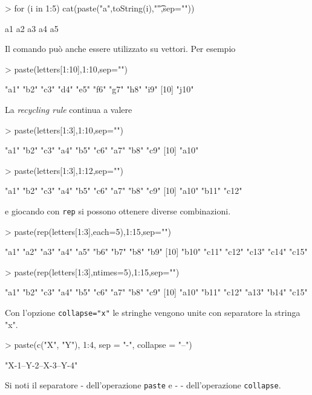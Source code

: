 \documentclass[onecolumn,11pt]{book}
\begin{document}
\begin{Schunk}
\begin{Sinput}
> for (i in 1:5) cat(paste("a",toString(i),"\t",sep=""))
\end{Sinput}
\begin{Soutput}
a1	a2	a3	a4	a5	
\end{Soutput}
\end{Schunk}
Il comando pu\`o anche essere utilizzato su vettori. 
Per esempio
\begin{Schunk}
\begin{Sinput}
> paste(letters[1:10],1:10,sep="")
\end{Sinput}
\begin{Soutput}
 [1] "a1"  "b2"  "c3"  "d4"  "e5"  "f6"  "g7"  "h8"  "i9" 
[10] "j10"
\end{Soutput}
\end{Schunk}
La \textit{recycling rule} continua a valere

\begin{Schunk}
\begin{Sinput}
> paste(letters[1:3],1:10,sep="")
\end{Sinput}
\begin{Soutput}
 [1] "a1"  "b2"  "c3"  "a4"  "b5"  "c6"  "a7"  "b8"  "c9" 
[10] "a10"
\end{Soutput}
\begin{Sinput}
> paste(letters[1:3],1:12,sep="")
\end{Sinput}
\begin{Soutput}
 [1] "a1"  "b2"  "c3"  "a4"  "b5"  "c6"  "a7"  "b8"  "c9" 
[10] "a10" "b11" "c12"
\end{Soutput}
\end{Schunk}
e giocando con \texttt{rep} si possono ottenere diverse combinazioni.
\begin{Schunk}
\begin{Sinput}
> paste(rep(letters[1:3],each=5),1:15,sep="")
\end{Sinput}
\begin{Soutput}
 [1] "a1"  "a2"  "a3"  "a4"  "a5"  "b6"  "b7"  "b8"  "b9" 
[10] "b10" "c11" "c12" "c13" "c14" "c15"
\end{Soutput}
\begin{Sinput}
> paste(rep(letters[1:3],ntimes=5),1:15,sep="") 
\end{Sinput}
\begin{Soutput}
 [1] "a1"  "b2"  "c3"  "a4"  "b5"  "c6"  "a7"  "b8"  "c9" 
[10] "a10" "b11" "c12" "a13" "b14" "c15"
\end{Soutput}
\end{Schunk}
Con l'opzione \texttt{collapse="x"} le stringhe vengono unite con separatore la stringa "x".
\begin{Schunk}
\begin{Sinput}
> paste(c("X", "Y"), 1:4, sep = "-", collapse = "--")
\end{Sinput}
\begin{Soutput}
[1] "X-1--Y-2--X-3--Y-4"
\end{Soutput}
\end{Schunk}
Si noti il separatore - dell'operazione \texttt{paste} e  - - dell'operazione \texttt{collapse}.
 
\end{document}

